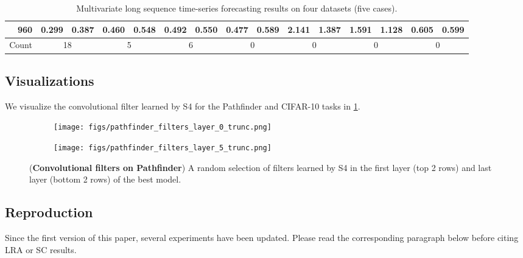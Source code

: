 \documentclass{article}
\newcommand{\methodabbrv}{S4}
\begin{document}
\begin{table*}[t]
{\begin{tabular}{c|c|cc|cc|cc|cc|cc|cc|cc}
                                          & 960                                        & \textbf{0.299}                & \textbf{0.387}                         & {0.460}                       & {0.548}                       & 0.492                      & 0.550                        & 0.477   & 0.589 & 2.141 & 1.387 & 1.591 & 1.128 & 0.605    & 0.599 \\
\midrule[1.0pt]
\multicolumn{2}{c}{Count}                 & \multicolumn{2}{|c}{18}                    & \multicolumn{2}{|c}{5}        & \multicolumn{2}{|c}{6}                 & \multicolumn{2}{|c}{0}        & \multicolumn{2}{|c}{0}        & \multicolumn{2}{|c}{0}     & \multicolumn{2}{|c}{0}      \\
\bottomrule[1.0pt]

\end{tabular}}
\caption{Multivariate long sequence time-series forecasting results on four datasets (five cases).}
\label{tab:informer-m}
\end{table*}


\subsection{Visualizations}
We visualize the convolutional filter  learned by \methodabbrv{} for the Pathfinder and CIFAR-10 tasks in \cref{fig:pathfinder-all-conv-filters}.

\begin{figure}
    \centering
    \begin{subfigure}{\linewidth}
        \texttt{[image: figs/pathfinder\_filters\_layer\_0\_trunc.png]}
    \end{subfigure}
    \begin{subfigure}{\linewidth}
        \texttt{[image: figs/pathfinder\_filters\_layer\_5\_trunc.png]}
    \end{subfigure}
    \label{fig:pathfinder-all-conv-filters}
    \caption{({\bf Convolutional filters on Pathfinder}) A random selection of filters learned by \methodabbrv{} in the first layer (top 2 rows) and last layer (bottom 2 rows) of the best model.}
\end{figure}

\subsection{Reproduction}
\label{sec:reproduction}

Since the first version of this paper, several experiments have been updated. Please read the corresponding paragraph below before citing LRA or SC results.
\end{document}
